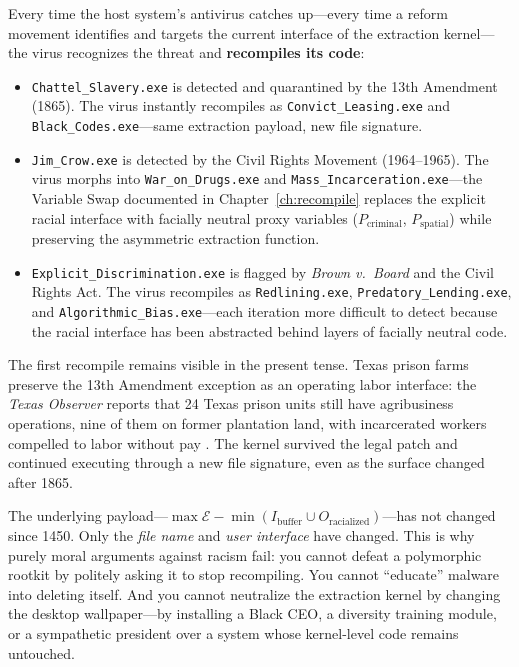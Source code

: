 Every time the host system's antivirus catches up---every time a reform movement identifies and targets the current interface of the extraction kernel---the virus recognizes the threat and \textbf{recompiles its code}:

\begin{itemize}
    \item \texttt{Chattel\_Slavery.exe} is detected and quarantined by the 13th Amendment (1865). The virus instantly recompiles as \texttt{Convict\_Leasing.exe} and \texttt{Black\_Codes.exe}---same extraction payload, new file signature.

    \item \texttt{Jim\_Crow.exe} is detected by the Civil Rights Movement (1964--1965). The virus morphs into \texttt{War\_on\_Drugs.exe} and \texttt{Mass\_Incarceration.exe}---the Variable Swap documented in Chapter~\ref{ch:recompile} replaces the explicit racial interface with facially neutral proxy variables ($P_{\text{criminal}}$, $P_{\text{spatial}}$) while preserving the asymmetric extraction function.

    \item \texttt{Explicit\_Discrimination.exe} is flagged by \textit{Brown v.\ Board} and the Civil Rights Act. The virus recompiles as \texttt{Redlining.exe}, \texttt{Predatory\_Lending.exe}, and \texttt{Algorithmic\_Bias.exe}---each iteration more difficult to detect because the racial interface has been abstracted behind layers of facially neutral code.
\end{itemize}

The first recompile remains visible in the present tense. Texas prison farms preserve the 13th Amendment exception as an operating labor interface: the \textit{Texas Observer} reports that 24 Texas prison units still have agribusiness operations, nine of them on former plantation land, with incarcerated workers compelled to labor without pay \cite{texas_observer_prison_plantations_2024}. The kernel survived the legal patch and continued executing through a new file signature, even as the surface changed after 1865.

The underlying payload---$\max \mathcal{E} - \min(I_{\text{buffer}} \cup O_{\text{racialized}})$---has not changed since 1450. Only the \textit{file name} and \textit{user interface} have changed. This is why purely moral arguments against racism fail: you cannot defeat a polymorphic rootkit by politely asking it to stop recompiling. You cannot ``educate'' malware into deleting itself. And you cannot neutralize the extraction kernel by changing the desktop wallpaper---by installing a Black CEO, a diversity training module, or a sympathetic president over a system whose kernel-level code remains untouched.

